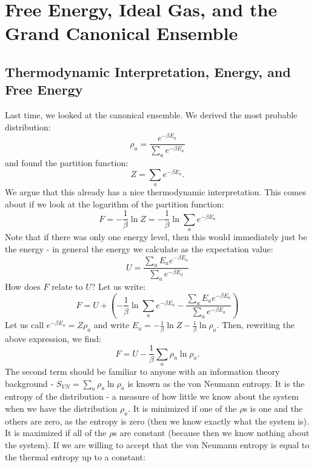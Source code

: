 \section{Free Energy, Ideal Gas, and the Grand Canonical Ensemble}

\subsection{Thermodynamic Interpretation, Energy, and Free Energy}
Last time, we looked at the canonical ensemble. We derived the most probable distribution:
\begin{equation}
    \rho_a = \frac{e^{-\beta E_a}}{\sum_a e^{-\beta E_a}}
\end{equation}
and found the partition function:
\begin{equation}
    Z = \sum_a e^{-\beta E_a}.
\end{equation}
We argue that this already has a nice thermodynamic interpretation. This comes about if we look at the logarithm of the partition function:
\begin{equation}
    F = -\frac{1}{\beta}\ln Z = -\frac{1}{\beta}\ln \sum_a e^{-\beta E_a}
\end{equation}
Note that if there was only one energy level, then this would immediately just be the energy - in general the energy we calculate as the expectation value:
\begin{equation}
    U = \frac{\sum_a E_a e^{-\beta E_a}}{\sum_a e^{-\beta E_a}}
\end{equation}
How does $F$ relate to $U$? Let us write:
\begin{equation}
    F = U + \left(-\frac{1}{\beta}\ln \sum_a e^{-\beta E_a} - \frac{\sum_a E_a e^{-\beta E_a}}{\sum_a e^{-\beta E_a}}\right)
\end{equation}
Let us call $e^{-\beta E_a} = Z \rho_a$ and write $E_a = -\frac{1}{\beta}\ln Z - \frac{1}{\beta}\ln \rho_a$. Then, rewriting the above expression, we find:
\begin{equation}
    F = U - \frac{1}{\beta}\sum_a \rho_a \ln \rho_a.
\end{equation}
The second term should be familiar to anyone with an information theory background - $S_{VN} = \sum_a \rho_a \ln \rho_a$ is known as the von Neumann entropy. It is the entropy of the distribution - a measure of how little we know about the system when we have the distribution $\rho_a$. It is minimized if one of the $\rho$s is one and the others are zero, as the entropy is zero (then we know exactly what the system is). It is maximized if all of the $\rho$s are constant (because then we know nothing about the system). If we are willing to accept that the von Neumann entropy is equal to the thermal entropy up to a constant:
